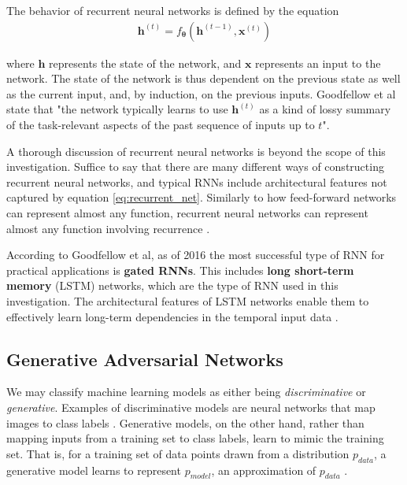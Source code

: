 \documentclass[12pt, titlepage]{report}
\theoremstyle{definition}
\begin{document}
The behavior of recurrent neural networks is defined by the equation
\begin{gather}\label{eq:recurrent_net}
\bm{h}^{(t)} = f_{\bm{\theta}}(\bm{h}^{(t - 1)}, \bm{x}^{(t)})
\end{gather}

where $\bm{h}$ represents the state of the network, and $\bm{x}$ represents an input to the network. The state of the network is thus dependent on the previous state as well as the current input, and, by induction, on the previous inputs. Goodfellow et al state that "the network typically learns to use $\bm{h}^{(t)}$ as a kind of lossy summary of the task-relevant aspects of the past sequence of inputs up to $t$"\cite{goodfellow2016deep}.

A thorough discussion of recurrent neural networks is beyond the scope of this investigation. Suffice to say that there are many different ways of constructing recurrent neural networks, and typical RNNs include architectural features not captured by equation \ref{eq:recurrent_net}. Similarly to how feed-forward networks can represent almost any function, recurrent neural networks can represent almost any function involving recurrence \cite[p. 370]{goodfellow2016deep}.

According to Goodfellow et al, as of 2016 the most successful type of RNN for practical applications is \textbf{gated RNNs}. This includes \textbf{long short-term memory} (LSTM) networks, which are the type of RNN used in this investigation. The architectural features of LSTM networks enable them to effectively learn long-term dependencies in the temporal input data \cite[p. 404-407]{goodfellow2016deep}.



\subsection{Generative Adversarial Networks}\label{subsection:generativeadversarial}
We may classify machine learning models as either being \textit{discriminative} or \textit{generative}. Examples of discriminative models are neural networks that map images to class labels \cite[p. 1]{goodfellow2014generative}. Generative models, on the other hand, rather than mapping inputs from a training set to class labels, learn to mimic the training set. That is, for a training set of data points drawn from a distribution $p_{data}$, a generative model learns to represent $p_{model}$, an approximation of $p_{data}$ \cite{goodfellow2016nips}.
\end{document}
